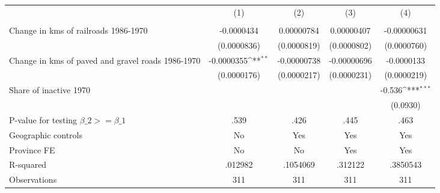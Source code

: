 {
\def\sym#1{\ifmmode^{#1}\else\(^{#1}\)\fi}
\begin{tabular}{l*{4}{c}}
\hline\hline
                &\multicolumn{1}{c}{(1)}&\multicolumn{1}{c}{(2)}&\multicolumn{1}{c}{(3)}&\multicolumn{1}{c}{(4)}\\
                &\multicolumn{1}{c}{}&\multicolumn{1}{c}{}&\multicolumn{1}{c}{}&\multicolumn{1}{c}{}\\
\hline
Change in kms of railroads 1986-1970&-0.0000434         &0.00000784         &0.00000407         &-0.00000631         \\
                &(0.0000836)         &(0.0000819)         &(0.0000802)         &(0.0000760)         \\
[1em]
Change in kms of paved and gravel roads 1986-1970&-0.0000355\sym{**} &-0.00000738         &-0.00000696         &-0.0000133         \\
                &(0.0000176)         &(0.0000217)         &(0.0000231)         &(0.0000219)         \\
[1em]
Share of inactive 1970&                  &                  &                  &   -0.536\sym{***}\\
                &                  &                  &                  & (0.0930)         \\
\hline
P-value for testing $\beta\_{2} >= \beta\_{1}$&     .539         &     .426         &     .445         &     .463         \\
Geographic controls&       No         &      Yes         &      Yes         &      Yes         \\
Province FE     &       No         &       No         &      Yes         &      Yes         \\
R-squared       &  .012982         & .1054069         &  .312122         & .3850543         \\
Observations    &      311         &      311         &      311         &      311         \\
\hline\hline
\end{tabular}
}
